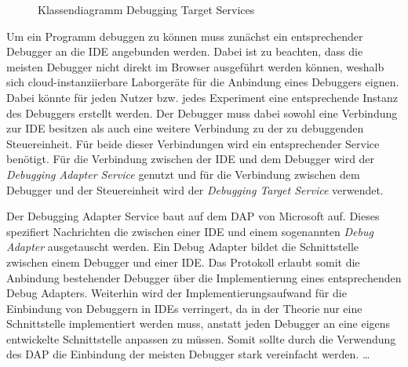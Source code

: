 \begin{figure}[tbp]
    \centering
    \caption{Klassendiagramm Debugging Target Services}
    \label{figure:klassendiagramm-debugging-target-services}
\end{figure}

Um ein Programm debuggen zu können muss zunächst ein entsprechender Debugger an die IDE angebunden werden. Dabei ist zu beachten, dass die meisten Debugger nicht direkt im Browser ausgeführt werden können, weshalb sich cloud-instanziierbare Laborgeräte für die Anbindung eines Debuggers eignen. Dabei könnte für jeden Nutzer bzw. jedes Experiment eine entsprechende Instanz des Debuggers erstellt werden. Der Debugger muss dabei sowohl eine Verbindung zur IDE besitzen als auch eine weitere Verbindung zu der zu debuggenden Steuereinheit. Für beide dieser Verbindungen wird ein entsprechender Service benötigt. Für die Verbindung zwischen der IDE und dem Debugger wird der \textit{Debugging Adapter Service} genutzt und für die Verbindung zwischen dem Debugger und der Steuereinheit wird der \textit{Debugging Target Service} verwendet.

Der Debugging Adapter Service baut auf dem \ac{DAP} \cite{noauthor_debug-adapter-protocol_nodate} von Microsoft auf. Dieses spezifiert Nachrichten die zwischen einer IDE und einem sogenannten \textit{Debug Adapter} ausgetauscht werden. Ein Debug Adapter bildet die Schnittstelle zwischen einem Debugger und einer IDE. Das Protokoll erlaubt somit die Anbindung bestehender Debugger über die Implementierung eines entsprechenden Debug Adapters. Weiterhin wird der Implementierungsaufwand für die Einbindung von Debuggern in IDEs verringert, da in der Theorie nur eine Schnittstelle implementiert werden muss, anstatt jeden Debugger an eine eigens entwickelte Schnittstelle anpassen zu müssen. Somit sollte durch die Verwendung des \ac{DAP} die Einbindung der meisten Debugger stark vereinfacht werden. \dots

